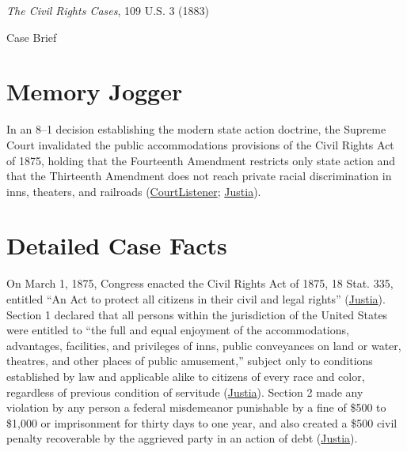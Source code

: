 \documentclass[12pt]{article}
\begin{document}
\begin{center}
{\LARGE \textit{The Civil Rights Cases}, 109 U.S. 3 (1883)\par}
\vspace{0.8em}
{\large Case Brief\par}
\end{center}
\vspace{1em}

\section{Memory Jogger}

In an 8--1 decision establishing the modern state action doctrine, the Supreme Court invalidated the public accommodations provisions of the Civil Rights Act of 1875, holding that the Fourteenth Amendment restricts only state action and that the Thirteenth Amendment does not reach private racial discrimination in inns, theaters, and railroads (\href{https://www.courtlistener.com/opinion/90897/civil-rights-cases/}{CourtListener}; \href{https://supreme.justia.com/cases/federal/us/109/3/}{Justia}).

\section{Detailed Case Facts}

On March 1, 1875, Congress enacted the Civil Rights Act of 1875, 18 Stat. 335, entitled ``An Act to protect all citizens in their civil and legal rights'' (\href{https://supreme.justia.com/cases/federal/us/109/3/}{Justia}). Section 1 declared that all persons within the jurisdiction of the United States were entitled to ``the full and equal enjoyment of the accommodations, advantages, facilities, and privileges of inns, public conveyances on land or water, theatres, and other places of public amusement,'' subject only to conditions established by law and applicable alike to citizens of every race and color, regardless of previous condition of servitude (\href{https://supreme.justia.com/cases/federal/us/109/3/}{Justia}). Section 2 made any violation by any person a federal misdemeanor punishable by a fine of \$500 to \$1,000 or imprisonment for thirty days to one year, and also created a \$500 civil penalty recoverable by the aggrieved party in an action of debt (\href{https://supreme.justia.com/cases/federal/us/109/3/}{Justia}).
\end{document}
